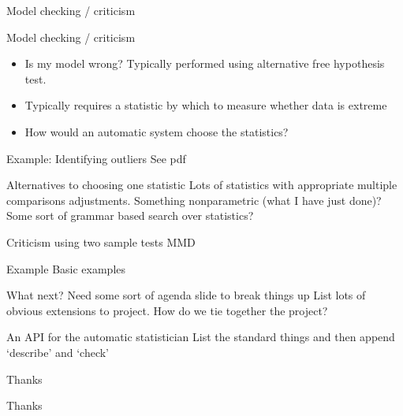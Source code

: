 \begin{frame}{Model checking / criticism}
  
\end{frame}

\begin{frame}{Model checking / criticism}
  \begin{itemize}
    \item Is my model wrong? Typically performed using alternative free hypothesis test.
    \vspace{\baselineskip}
    \item Typically requires a statistic by which to measure whether data is extreme
    \vspace{\baselineskip}
    \item How would an automatic system choose the statistics?
  \end{itemize}
\end{frame}

\begin{frame}{Example: Identifying outliers}
  See pdf
\end{frame}

\begin{frame}{Alternatives to choosing one statistic}
  Lots of statistics with appropriate multiple comparisons adjustments. Something nonparametric (what I have just done)? Some sort of grammar based search over statistics?
\end{frame}

\begin{frame}{Criticism using two sample tests}
  MMD
\end{frame}

\begin{frame}{Example}
  Basic examples
\end{frame}

\begin{frame}{What next?}
Need some sort of agenda slide to break things up
List lots of obvious extensions to project.
How do we tie together the project?
\end{frame}

\begin{frame}{An API for the automatic statistician}
  List the standard things and then append `describe' and `check'
\end{frame}

\begin{frame}{Thanks}
  \begin{center}
  \Huge
  Thanks
  \end{center}
\end{frame}

